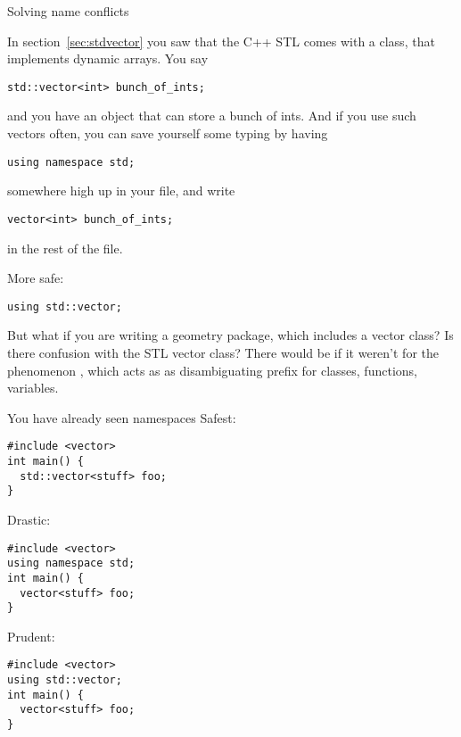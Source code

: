 
 {Solving name conflicts}
\label{sec:usename}

In section~\ref{sec:stdvector} you saw that the C++ \ac{STL} comes with
a  class, that implements dynamic arrays. You say
\begin{lstlisting}
std::vector<int> bunch_of_ints;
\end{lstlisting}
and you have an object that can store a bunch of ints. And if you use
such vectors often, you can save yourself some typing by having
\begin{lstlisting}
using namespace std;
\end{lstlisting}
somewhere high up in your file, and write
\begin{lstlisting}
vector<int> bunch_of_ints;
\end{lstlisting}
in the rest of the file.

More safe:
\begin{lstlisting}
using std::vector;
\end{lstlisting}

But what if you are writing a geometry package, which includes a
vector class? Is there confusion with the \ac{STL} vector class?
There would be if it weren't for the phenomenon
, which acts as as disambiguating prefix for
classes, functions, variables.

\begin{slide}{You have already seen namespaces}
  \label{sl:vec-namespace}
  Safest:
\begin{lstlisting}
#include <vector>
int main() {
  std::vector<stuff> foo;
}
\end{lstlisting}
\begin{multicols}{2}
  Drastic:
\begin{lstlisting}
#include <vector>
using namespace std;
int main() {
  vector<stuff> foo;
}
\end{lstlisting}
\vfill\columnbreak
Prudent:
\begin{lstlisting}
#include <vector>
using std::vector;
int main() {
  vector<stuff> foo;
}
\end{lstlisting}
\end{multicols}
\end{slide}

